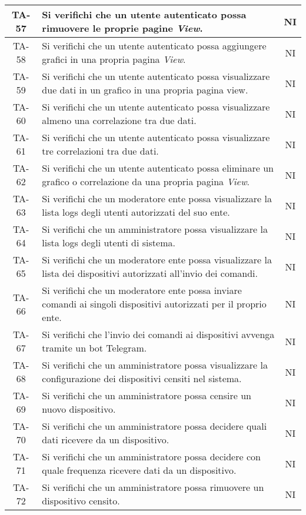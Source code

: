 \begin{center}
\begin{longtable}{|c|p{10cm}|c|}
			 \hline
			 TA-57 & Si verifichi che un utente autenticato possa rimuovere le proprie pagine \textit{View}. & NI \\
			 \hline
			 TA-58 & Si verifichi che un utente autenticato possa aggiungere grafici in una propria pagina  \textit{View}. & NI \\
			 \hline
			 TA-59 & Si verifichi che un utente autenticato possa visualizzare due dati in un grafico in una propria pagina view. & NI \\
			 \hline
			 TA-60 & Si verifichi che un utente autenticato possa visualizzare almeno una correlazione tra due dati. & NI \\
			 \hline
			 TA-61 & Si verifichi che un utente autenticato possa visualizzare tre correlazioni tra due dati. & NI \\
			 \hline
			 TA-62 & Si verifichi che un utente autenticato possa eliminare un grafico o correlazione da una propria pagina \textit{View}. & NI \\
			 \hline
			 TA-63 & Si verifichi che un moderatore ente possa visualizzare la lista logs degli utenti autorizzati del suo ente. & NI \\
			 \hline
			 TA-64 & Si verifichi che un amministratore possa visualizzare la lista logs degli utenti di sistema. & NI \\
			 \hline
			 TA-65 & Si verifichi che un moderatore ente possa visualizzare la lista dei dispositivi autorizzati all'invio dei comandi. & NI \\
			 \hline
			 TA-66 & Si verifichi che un moderatore ente possa inviare comandi ai singoli dispositivi autorizzati per il proprio ente. & NI \\
			 \hline
			 TA-67 & Si verifichi che l'invio dei comandi ai dispositivi avvenga tramite un bot Telegram. & NI \\
			 \hline
			 TA-68 & Si verifichi che un amministratore possa visualizzare la configurazione dei dispositivi censiti nel sistema. & NI \\
			 \hline
			 TA-69 & Si verifichi che un amministratore possa censire un nuovo dispositivo. & NI \\
			 \hline
			 TA-70 & Si verifichi che un amministratore possa decidere quali dati ricevere da un dispositivo. & NI \\
			 \hline
			 TA-71 & Si verifichi che un amministratore possa decidere con quale frequenza ricevere dati da un dispositivo. & NI \\
			 \hline
			 TA-72 & Si verifichi che un amministratore possa rimuovere un dispositivo censito. & NI \\

\end{longtable}
\end{center}
